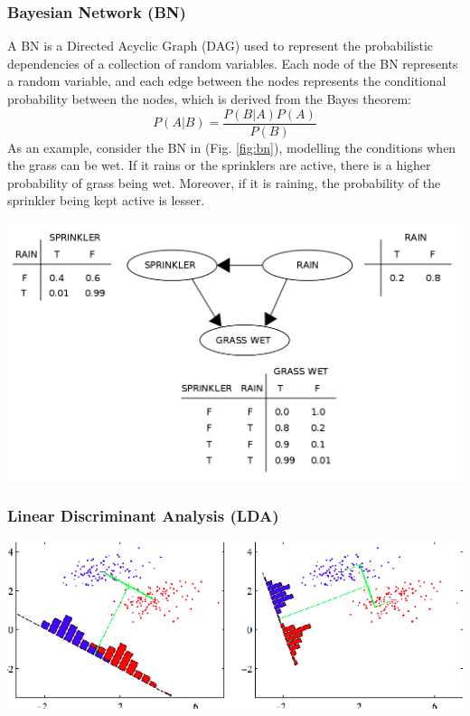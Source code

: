 \documentclass[a4paper, 12pt]{article}
\begin{document}
\subsubsection{Bayesian Network (BN)}
\noindent A BN is a Directed Acyclic Graph (DAG) used to represent the probabilistic dependencies of a collection of random variables. Each node of the BN represents a random variable, and each edge between the nodes represents the conditional probability between the nodes, which is derived from the Bayes theorem:
\begin{equation}
    P(A|B) = \frac{P(B|A)P(A)}{P(B)}
\end{equation}
As an example, consider the BN in (Fig. \ref{fig:bn}), modelling the conditions when the grass can be wet. If it rains or the sprinklers are active, there is a higher probability of grass being wet. Moreover, if it is raining, the probability of the sprinkler being kept active is lesser.
\begin{center}
\includegraphics[scale=0.3]{bn.png}
\label{fig:bn}
\end{center}

\vskip 0.2in
\subsubsection{Linear Discriminant Analysis (LDA)}
\begin{center}
\includegraphics[scale=0.65]{lda - paper.png}
\label{fig:lda}
\end{center}
\end{document}
